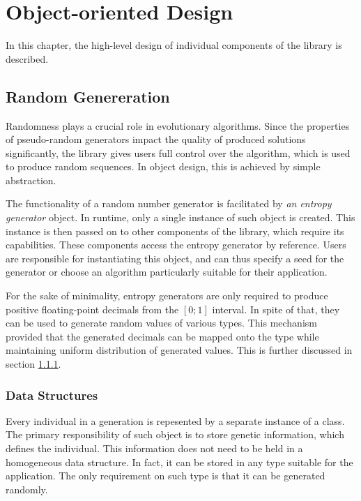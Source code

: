 \chapter{Object-oriented Design}
In this chapter, the high-level design of individual components of the library is described.

\cite{Koza1992}
\todo %


\section{Random Genereration}
Randomness plays a crucial role in evolutionary algorithms. Since the properties of pseudo-random generators impact the quality of produced solutions significantly, the library gives users full control over the algorithm, which is used to produce random sequences. In object design, this is achieved by simple abstraction.

The functionality of a random number generator is facilitated by \textit{an entropy generator} object. In runtime, only a single instance of such object is created. This instance is then passed on to other components of the library, which require its capabilities. These components access the entropy generator by reference. Users are responsible for instantiating this object, and can thus specify a seed for the generator or choose an algorithm particularly suitable for their application.

For the sake of minimality, entropy generators are only required to produce positive floating-point decimals from the $[0;1]$ interval. In spite of that, they can be used to generate random values of various types. This mechanism provided that the generated decimals can be mapped onto the type while maintaining uniform distribution of generated values. This is further discussed in section \ref{section:data-structures}.


\subsection{Data Structures}\label{section:data-structures}
Every individual in a generation is repesented by a separate instance of a class. The primary responsibility of such object is to store genetic information, which defines the individual. This information does not need to be held in a homogeneous data structure. In fact, it can be stored in any type suitable for the application. The only requirement on such type is that it can be generated randomly.



